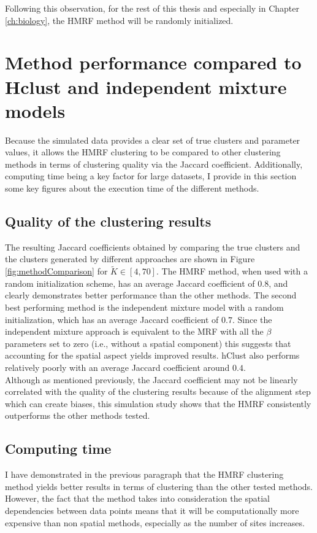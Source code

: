 Following this observation, for the rest of this thesis and especially in Chapter \ref{ch:biology}, the HMRF method will be randomly initialized.

\section{Method performance compared to Hclust and independent mixture models}
 Because the simulated data provides a clear set of true clusters and parameter values, it allows the HMRF clustering to be compared to other clustering methods in terms of clustering quality via the Jaccard coefficient. Additionally, computing time being a key factor for large datasets, I provide in this section some key figures about the execution time of the different methods.
	\subsection{Quality of the clustering results}
	
	The resulting Jaccard coefficients obtained by comparing the true clusters and the clusters generated by different approaches are shown in Figure \ref{fig:methodComparison} for $\tilde{K} \in [4,70]$. The HMRF method, when used with a random initialization scheme, has an average Jaccard coefficient of $0.8$, and clearly demonstrates better performance than the other methods. The second best performing method is the independent mixture model with a random initialization, which has an average Jaccard coefficient of $0.7$. Since the independent mixture approach is equivalent to the MRF with all the $\beta$ parameters set to zero (i.e., without a spatial component) this suggests that accounting for the spatial aspect yields improved results. hClust also performs relatively poorly with an average Jaccard coefficient around $0.4$.\\
	
	Although as mentioned previously, the Jaccard coefficient may not be linearly correlated with the quality of the clustering results because of the alignment step which can create biases, this simulation study shows that the HMRF consistently outperforms the other methods tested.
	
	
	\subsection{Computing time}
	I have demonstrated in the previous paragraph that the HMRF clustering method yields better results in terms of clustering than the other tested methods. However, the fact that the method takes into consideration the spatial dependencies between data points means that it will be computationally more expensive than non spatial methods, especially as the number of sites increases.\\
	
